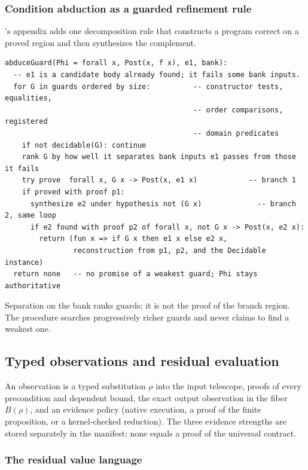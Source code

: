 \subsubsection{Condition abduction as a guarded refinement rule}

's appendix adds one decomposition rule that constructs a program correct on a proved region and then synthesizes the complement.

\begin{lstlisting}
abduceGuard(Phi = forall x, Post(x, f x), e1, bank):
  -- e1 is a candidate body already found; it fails some bank inputs.
  for G in guards ordered by size:          -- constructor tests, equalities,
                                            -- order comparisons, registered
                                            -- domain predicates
    if not decidable(G): continue
    rank G by how well it separates bank inputs e1 passes from those it fails
    try prove  forall x, G x -> Post(x, e1 x)            -- branch 1
    if proved with proof p1:
      synthesize e2 under hypothesis not (G x)             -- branch 2, same loop
      if e2 found with proof p2 of forall x, not G x -> Post(x, e2 x):
        return (fun x => if G x then e1 x else e2 x,
                reconstruction from p1, p2, and the Decidable instance)
  return none   -- no promise of a weakest guard; Phi stays authoritative
\end{lstlisting}
Separation on the bank ranks guards; it is not the proof of the branch region. The procedure searches progressively richer guards and never claims to find a weakest one.

\subsection{Typed observations and residual evaluation}

\begin{definition}
An observation is a typed substitution $\rho$ into the input telescope, proofs of every precondition and dependent bound, the exact output observation in the fiber $B(\rho)$, and an evidence policy (native execution, a proof of the finite proposition, or a kernel-checked reduction). The three evidence strengths are stored separately in the manifest; none equals a proof of the universal contract.
\end{definition}

\subsubsection{The residual value language}

